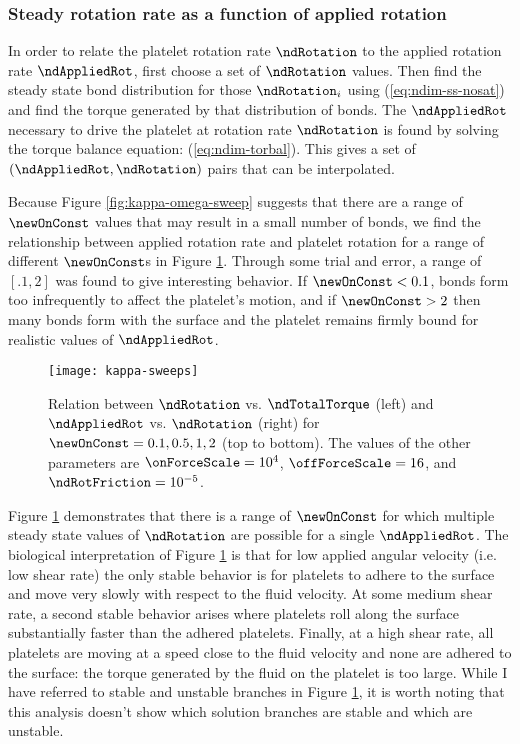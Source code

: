 \subsubsection{Steady rotation rate as a function of applied rotation}
\label{sec:rotation-vs-applied}

In order to relate the platelet rotation rate $\ndRotation$ to the
applied rotation rate $\ndAppliedRot$, first choose a set of
$\ndRotation$ values. Then find the steady state bond distribution for
those $\ndRotation_i$ using (\ref{eq:ndim-ss-nosat}) and find the
torque generated by that distribution of bonds. The $\ndAppliedRot$
necessary to drive the platelet at rotation rate $\ndRotation$ is
found by solving the torque balance equation:
(\ref{eq:ndim-torbal}). This gives a set of
$(\ndAppliedRot, \ndRotation)$ pairs that can be interpolated.

Because Figure \ref{fig:kappa-omega-sweep} suggests that there are a
range of $\newOnConst$ values that may result in a small number of
bonds, we find the relationship between applied rotation rate and
platelet rotation for a range of different $\newOnConst$s in Figure
\ref{fig:steady-states}. Through some trial and error, a range of
$[.1, 2]$ was found to give interesting behavior. If $\newOnConst <
0.1$, bonds form too infrequently to affect the platelet's motion, and
if $\newOnConst > 2$ then many bonds form with the surface and the
platelet remains firmly bound for realistic values of $\ndAppliedRot$.

\begin{figure}
  \centering
  \texttt{[image: kappa-sweeps]}
  \caption[Relation between $\ndRotation$ vs. $\ndTotalTorque$ and
  $\ndAppliedRot$ vs. $\ndRotation$ for varying
  $\newOnConst$.]{Relation between $\ndRotation$ vs. $\ndTotalTorque$
    (left) and $\ndAppliedRot$ vs. $\ndRotation$ (right) for
    $\newOnConst = 0.1, 0.5, 1, 2$ (top to bottom). The values of the
    other parameters are $\onForceScale = 10^4$,
    $\offForceScale = 16$, and $\ndRotFriction = 10^{-5}$.}
  \label{fig:steady-states}
\end{figure}

Figure \ref{fig:steady-states} demonstrates that there is a range of
$\newOnConst$ for which multiple steady state values of $\ndRotation$
are possible for a single $\ndAppliedRot$. The biological
interpretation of Figure \ref{fig:steady-states} is that for low
applied angular velocity (i.e. low shear rate) the only stable
behavior is for platelets to adhere to the surface and move very
slowly with respect to the fluid velocity. At some medium shear rate,
a second stable behavior arises where platelets roll along the surface
substantially faster than the adhered platelets. Finally, at a high
shear rate, all platelets are moving at a speed close to the fluid
velocity and none are adhered to the surface: the torque generated by
the fluid on the platelet is too large. While I have referred to
stable and unstable branches in Figure \ref{fig:steady-states}, it is
worth noting that this analysis doesn't show which solution branches
are stable and which are unstable.

